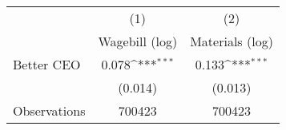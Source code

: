 {
\def\sym#1{\ifmmode^{#1}\else\(^{#1}\)\fi}
\begin{tabular}{l*{2}{c}}
\hline\hline
                    &\multicolumn{1}{c}{(1)}&\multicolumn{1}{c}{(2)}\\
                    &\multicolumn{1}{c}{Wagebill (log)}&\multicolumn{1}{c}{Materials (log)}\\
\hline
Better CEO          &       0.078\sym{***}&       0.133\sym{***}\\
                    &     (0.014)         &     (0.013)         \\
\hline
Observations        &      700423         &      700423         \\
\hline\hline
\end{tabular}
}
